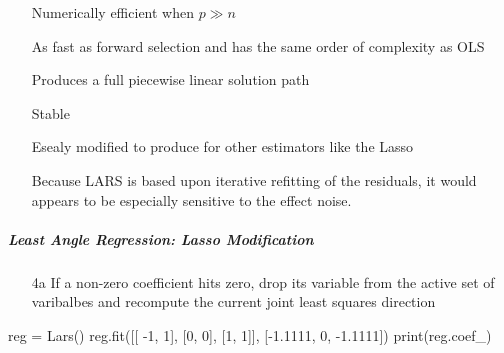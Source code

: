 \begin{itemize}
	\item[\tV{+}] Numerically efficient when $p\gg n$
	\item[\tV{+}] As fast as forward selection and has the same order of complexity as OLS
	\item[\tV{+}] Produces a full piecewise linear solution path
	\item[\tV{+}] Stable
	\item[\tV{+}] Esealy modified to produce for other estimators like the Lasso
	\item[\tR{-}] Because LARS is based upon iterative refitting of the residuals, it would
		appears to be especially sensitive to the effect noise.
\end{itemize}

\subparagraph{Least Angle Regression: Lasso Modification}
\begin{itemize}
	\item[4a] If a non-zero coefficient hits zero, drop its variable from the
		active set of varibalbes and recompute the current joint least squares
		direction
\end{itemize}
\begin{python}
reg = Lars()
reg.fit([[ -1, 1], [0, 0], [1, 1]], [-1.1111, 0, -1.1111])
print(reg.coef_)
\end{python}
